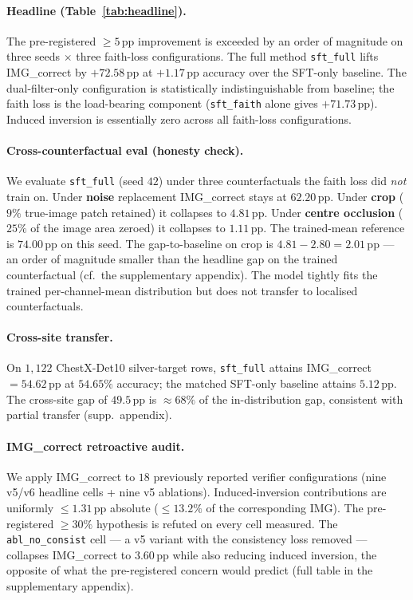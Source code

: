 \documentclass{article}
\begin{document}
\paragraph{Headline (Table~\ref{tab:headline}).} The pre-registered
$\geq 5$\,pp improvement is exceeded by an order of magnitude on
three seeds $\times$ three faith-loss configurations. The full
method \texttt{sft\_full} lifts IMG\_correct by $+72.58$\,pp at
$+1.17$\,pp accuracy over the SFT-only baseline. The
dual-filter-only configuration is statistically indistinguishable
from baseline; the faith loss is the load-bearing component
(\texttt{sft\_faith} alone gives $+71.73$\,pp). Induced inversion
is essentially zero across all faith-loss configurations.

\paragraph{Cross-counterfactual eval (honesty check).} We evaluate
\texttt{sft\_full} (seed $42$) under three counterfactuals the
faith loss did \emph{not} train on. Under \textbf{noise}
replacement IMG\_correct stays at $62.20$\,pp. Under \textbf{crop}
($9\%$ true-image patch retained) it collapses to $4.81$\,pp.
Under \textbf{centre occlusion} ($25\%$ of the image area zeroed)
it collapses to $1.11$\,pp. The trained-mean reference is
$74.00$\,pp on this seed. The gap-to-baseline on crop is
$4.81 - 2.80 = 2.01$\,pp --- an order of magnitude smaller than the
headline gap on the trained counterfactual (cf.\
the supplementary appendix). The model tightly fits the trained
per-channel-mean distribution but does not transfer to localised
counterfactuals.

\paragraph{Cross-site transfer.} On $1{,}122$ ChestX-Det10
silver-target rows, \texttt{sft\_full} attains IMG\_correct
$= 54.62$\,pp at $54.65\%$ accuracy; the matched SFT-only baseline
attains $5.12$\,pp. The cross-site gap of $49.5$\,pp is
$\approx 68\%$ of the in-distribution gap, consistent with partial
transfer (supp.\ appendix).

\paragraph{IMG\_correct retroactive audit.}
\label{sec:audit}
We apply IMG\_correct to $18$ previously reported verifier
configurations (nine v5/v6 headline cells + nine v5 ablations).
Induced-inversion contributions are uniformly $\leq 1.31$\,pp
absolute ($\leq 13.2\%$ of the corresponding IMG). The
pre-registered $\geq 30\%$ hypothesis is refuted on every cell
measured. The \texttt{abl\_no\_consist} cell --- a v5 variant with
the consistency loss removed --- collapses IMG\_correct to
$3.60$\,pp while also reducing induced inversion, the opposite of
what the pre-registered concern would predict (full table in
the supplementary appendix).
\end{document}
